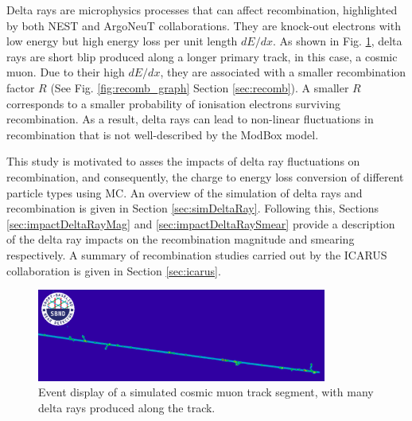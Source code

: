 Delta rays are microphysics processes that can affect recombination, highlighted by both NEST \cite{NEST} and ArgoNeuT \cite{argoneut_recomb} collaborations.
They are knock-out electrons with low energy but high energy loss per unit length $dE/dx$.
As shown in Fig. \ref{fig:delta_ray_evd}, delta rays are short blip produced along a longer primary track, in this case, a cosmic muon.                      
Due to their high $dE/dx$, they are associated with a smaller recombination factor $R$ (See Fig. \ref{fig:recomb_graph} Section \ref{sec:recomb}).
A smaller $R$ corresponds to a smaller probability of ionisation electrons surviving recombination.
As a result, delta rays can lead to non-linear fluctuations in recombination that is not well-described by the ModBox model.

This study is motivated to asses the impacts of delta ray fluctuations on recombination, and consequently, the charge to energy loss conversion of different particle types using MC.
An overview of the simulation of delta rays and recombination is given in Section \ref{sec:simDeltaRay}.%
Following this, Sections \ref{sec:impactDeltaRayMag} and \ref{sec:impactDeltaRaySmear} provide a description of the delta ray impacts on the recombination magnitude and smearing respectively.
A summary of recombination studies carried out by the ICARUS collaboration is given in Section \ref{sec:icarus}.

\begin{figure}[hb!] 
\centering    
\includegraphics[width=0.85\textwidth]{delta_ray_evd}
\caption[Event Display of a Cosmic Muon and Delta Rays]{
Event display of a simulated cosmic muon track segment, with many delta rays produced along the track.
}
\label{fig:delta_ray_evd}
\end{figure}


